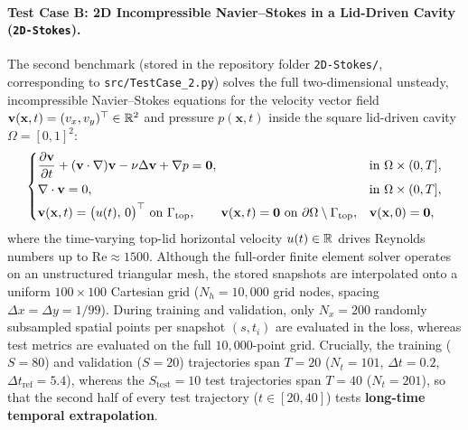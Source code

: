 \paragraph{Test Case B: 2D Incompressible Navier--Stokes in a Lid-Driven Cavity (\texttt{2D-Stokes}).}
The second benchmark (stored in the repository folder \texttt{2D-Stokes/}, corresponding to \texttt{src/TestCase\_2.py}) solves the full two-dimensional unsteady, incompressible Navier--Stokes equations for the velocity vector field $\mathbf{v}(\mathbf{x},t) = (v_x, v_y)^\top \in \mathbb{R}^2$ and pressure $p(\mathbf{x},t)$ inside the square lid-driven cavity $\Omega = [0,1]^2$:
\begin{equation}
  \begin{dcases}
    \frac{\partial \mathbf{v}}{\partial t} + (\mathbf{v}\cdot\nabla)\mathbf{v} - \nu\Delta\mathbf{v} + \nabla p = \mathbf{0}, & \text{in } \Omega \times (0, T], \\
    \nabla \cdot \mathbf{v} = 0, & \text{in } \Omega \times (0, T], \\
    \mathbf{v}(\mathbf{x},t) = \big(u(t),\,0\big)^\top \text{ on } \Gamma_{\mathrm{top}}, \qquad \mathbf{v}(\mathbf{x},t) = \mathbf{0} \text{ on } \partial\Omega \setminus \Gamma_{\mathrm{top}}, & \mathbf{v}(\mathbf{x},0) = \mathbf{0},
  \end{dcases}
  \label{eq:caseB_pde}
\end{equation}
where the time-varying top-lid horizontal velocity $u(t) \in \mathbb{R}$ drives Reynolds numbers up to $\mathrm{Re} \approx 1500$. Although the full-order finite element solver operates on an unstructured triangular mesh, the stored snapshots are interpolated onto a uniform $100 \times 100$ Cartesian grid ($N_h = 10{,}000$ grid nodes, spacing $\Delta x = \Delta y = 1/99$). During training and validation, only $N_x = 200$ randomly subsampled spatial points per snapshot $(s,t_i)$ are evaluated in the loss, whereas test metrics are evaluated on the full $10{,}000$-point grid. Crucially, the training ($S=80$) and validation ($S=20$) trajectories span $T = 20$ ($N_t = 101$, $\Delta t = 0.2$, $\Delta t_{\mathrm{ref}} = 5.4$), whereas the $S_{\mathrm{test}} = 10$ test trajectories span $T = 40$ ($N_t = 201$), so that the second half of every test trajectory ($t \in [20, 40]$) tests \textbf{long-time temporal extrapolation}.


